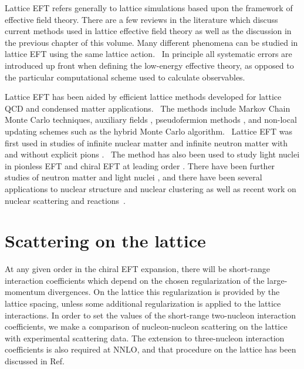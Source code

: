 Lattice EFT refers generally to lattice simulations based upon the framework of effective
field theory.  There are a few reviews in the literature which discuss current methods used
in lattice effective field theory \cite{Lee:2008fa,Drut:2012a} as well as the discussion in the previous chapter of this volume. Many different phenomena can be studied
in
lattice EFT using the same lattice action. \ In principle all systematic
errors are introduced up front when defining the low-energy effective theory,
as opposed to the particular computational scheme used to calculate
observables. \ 

Lattice EFT has been aided by efficient lattice methods developed for lattice QCD and condensed matter applications. \ The methods include
Markov Chain Monte Carlo techniques, auxiliary fields
\cite{Hubbard:1959ub,Stratonovich:1958}, pseudofermion methods
\cite{Weingarten:1980hx}, and non-local updating schemes such as the hybrid Monte
Carlo algorithm\cite{Scalettar:1986uy,Gottlieb:1987mq,Duane:1987de}. \ Lattice EFT
was
first used in studies of infinite nuclear matter \cite{Muller:1999cp} and
infinite neutron matter with and without explicit pions
\cite{Lee:2004si,Lee:2004qd,Lee:2005is,Lee:2005it}. \ The method has also been used
to
study light nuclei in pionless EFT \cite{Borasoy:2005yc} and chiral EFT at
leading order \cite{Borasoy:2006qn}. There have been further studies of neutron matter 
\cite{Borasoy:2007vi,Borasoy:2007vk,Wlazlowski:2014jna} and light nuclei \cite{Epelbaum:2009zs,Epelbaum:2009pd}, and there have been several applications to nuclear structure and nuclear clustering \cite{Epelbaum:2011md,Epelbaum:2012qn,Epelbaum:2012iu,Lahde:2013uqa,Epelbaum:2013paa,Elhatisari:2016owd} as well as recent work on nuclear scattering and reactions~\cite{Rupak:2013aue,Rupak:2014xza,Elhatisari:2015iga}.

\section{Scattering on the lattice}

At any given order in the chiral EFT expansion, there will be short-range interaction coefficients which depend on the chosen regularization of the large-momentum divergences.  On the lattice this regularization is provided by the lattice spacing, unless some additional regularization
is applied to the lattice interactions.
In order to set the values of the short-range two-nucleon interaction
coefficients, we make a comparison of nucleon-nucleon scattering on
the lattice with experimental scattering data.  The extension to three-nucleon
interaction coefficients is also required at NNLO, and that procedure
on the lattice has been discussed in Ref.~\cite{Epelbaum:2009zs}


